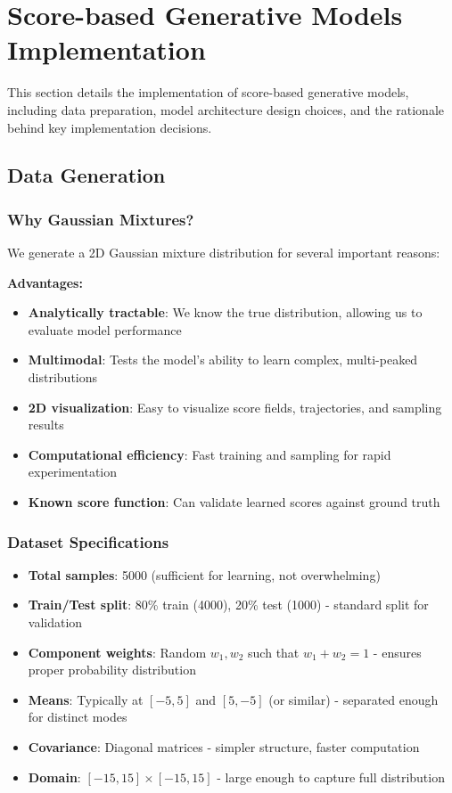 \documentclass[12pt,a4paper]{article}
\begin{document}
\section{Score-based Generative Models Implementation}

This section details the implementation of score-based generative models, including data preparation, model architecture design choices, and the rationale behind key implementation decisions.

\subsection{Data Generation}

\subsubsection{Why Gaussian Mixtures?}

We generate a 2D Gaussian mixture distribution for several important reasons:

\textbf{Advantages:}
\begin{itemize}
    \item \textbf{Analytically tractable}: We know the true distribution, allowing us to evaluate model performance
    \item \textbf{Multimodal}: Tests the model's ability to learn complex, multi-peaked distributions
    \item \textbf{2D visualization}: Easy to visualize score fields, trajectories, and sampling results
    \item \textbf{Computational efficiency}: Fast training and sampling for rapid experimentation
    \item \textbf{Known score function}: Can validate learned scores against ground truth
\end{itemize}

\subsubsection{Dataset Specifications}

\begin{itemize}
    \item \textbf{Total samples}: 5000 (sufficient for learning, not overwhelming)
    \item \textbf{Train/Test split}: 80\% train (4000), 20\% test (1000) - standard split for validation
    \item \textbf{Component weights}: Random $w_1, w_2$ such that $w_1 + w_2 = 1$ - ensures proper probability distribution
    \item \textbf{Means}: Typically at $[-5, 5]$ and $[5, -5]$ (or similar) - separated enough for distinct modes
    \item \textbf{Covariance}: Diagonal matrices - simpler structure, faster computation
    \item \textbf{Domain}: $[-15, 15] \times [-15, 15]$ - large enough to capture full distribution
\end{itemize}
\end{document}
